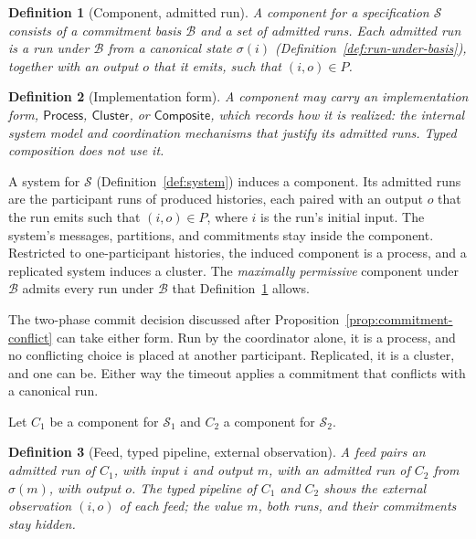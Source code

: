 \documentclass[sigconf]{cidr-2027}
\newtheorem{definition}{Definition}
\theoremstyle{remark}
\newcommand{\commitment}{commitment\xspace}
\newcommand{\commitments}{commitments\xspace}
\newcommand{\Spec}{\mathcal{S}}
\begin{document}
\begin{definition}[Component, admitted run]
\label{def:component}
A \emph{component} for a specification $\Spec$ consists of a \commitment basis
$\mathcal B$ and a set of \emph{admitted runs}. Each admitted run is a run
under $\mathcal B$ from a canonical state $\sigma(i)$
(Definition~\ref{def:run-under-basis}), together with an output $o$ that it
emits, such that $(i,o)\in P$.
\end{definition}

\begin{definition}[Implementation form]
\label{def:implementation-form}
A component may carry an \emph{implementation form}, $\mathsf{Process}$,
$\mathsf{Cluster}$, or $\mathsf{Composite}$, which records how it is
realized: the internal system model and coordination mechanisms that justify
its admitted runs. Typed composition does not use it.
\end{definition}

A system for $\Spec$ (Definition~\ref{def:system}) induces a component. Its
admitted runs are the participant runs of produced histories, each paired
with an output $o$ that the run emits such that $(i,o)\in P$, where $i$ is the
run's initial input. The system's messages, partitions, and \commitments stay
inside the component. Restricted to one-participant histories, the induced
component is a process, and a replicated system induces a cluster. The
\emph{maximally permissive} component under $\mathcal B$ admits every run
under $\mathcal B$ that Definition~\ref{def:component} allows.

The two-phase commit decision discussed after
Proposition~\ref{prop:commitment-conflict} can take either form. Run by the
coordinator alone, it is a process, and no conflicting choice is placed at
another participant. Replicated, it is a cluster, and one can be. Either way
the timeout applies a \commitment that conflicts with a canonical run.

Let $C_1$ be a component for $\Spec_1$ and $C_2$ a component for $\Spec_2$.

\begin{definition}[Feed, typed pipeline, external observation]
\label{def:typed-pipeline}
A \emph{feed} pairs an admitted run of $C_1$, with input $i$ and output $m$,
with an admitted run of $C_2$ from $\sigma(m)$, with output $o$. The
\emph{typed pipeline} of $C_1$ and $C_2$ shows the \emph{external
observation} $(i,o)$ of each feed; the value $m$, both runs, and their
\commitments stay hidden.
\end{definition}
\end{document}

